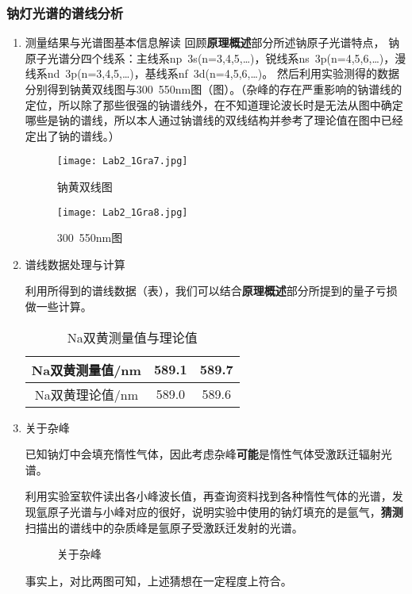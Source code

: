 \documentclass[dvipsnames, svgnames,a4paper,11pt]{article}
\begin{document}
	\subsubsection{钠灯光谱的谱线分析}
	\begin{enumerate}
		\item 测量结果与光谱图基本信息解读
		回顾\textbf{原理概述}部分所述钠原子光谱特点，
		钠原子光谱分四个线系：主线系np~3s(n=3,4,5,…)，锐线系ns~3p(n=4,5,6,…)，漫线系nd~3p(n=3,4,5,…)，基线系nf~3d(n=4,5,6,…)。
		然后利用实验测得的数据分别得到钠黄双线图与300~550nm图（图）。（杂峰的存在严重影响的钠谱线的定位，所以除了那些很强的钠谱线外，在不知道理论波长时是无法从图中确定哪些是钠的谱线，所以本人通过钠谱线的双线结构并参考了理论值在图中已经定出了钠的谱线。）
		
		\begin{figure}[htbp]
			\centering
			\texttt{[image: Lab2\_1Gra7.jpg]}
			\caption{钠黄双线图}
			\label{fig:fig7}
		\end{figure}
		
		\begin{figure}[htbp]
			\centering
			\texttt{[image: Lab2\_1Gra8.jpg]}
			\caption{300~550nm图}
			\label{fig:fig8}
		\end{figure}
		
		\item 谱线数据处理与计算
		
		利用所得到的谱线数据（表），我们可以结合\textbf{原理概述}部分所提到的量子亏损做一些计算。
		
		\begin{table}[ht]
			\centering
			\begin{tabular}{|c|c|c|}
				\hline
				Na双黄测量值/nm & 589.1 & 589.7 \\
				\hline
				Na双黄理论值/nm & 589.0 & 589.6 \\
				\hline
			\end{tabular}
			\caption{Na双黄测量值与理论值}
			\label{tab:tab1}
		\end{table}		
		
		\item 关于杂峰
		
		已知钠灯中会填充惰性气体，因此考虑杂峰\textbf{可能}是惰性气体受激跃迁辐射光谱。
		
		利用实验室软件读出各小峰波长值，再查询资料找到各种惰性气体的光谱，发现氩原子光谱与小峰对应的很好，说明实验中使用的钠灯填充的是氩气，\textbf{猜测}扫描出的谱线中的杂质峰是氩原子受激跃迁发射的光谱。
		
		\begin{figure}[htbp]
			\centering
			\caption{关于杂峰}
			\label{fig:fig9}			
		\end{figure}
		
		事实上，对比两图可知，上述猜想在一定程度上符合。
		
	\end{enumerate}
	
\end{document}
